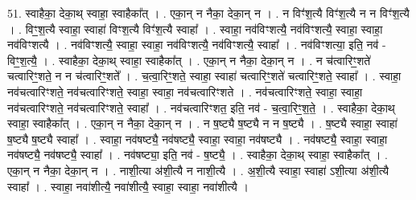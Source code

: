 \documentclass[17pt]{extarticle}
\begin{document}
51. स्वाहैका॒ देका॒थ् स्वाहा॒ स्वाहैका᳚त् । . एका॒न् न नैका॒ देका॒न् न । . न विꣳ॑श॒त्यै विꣳ॑श॒त्यै न न विꣳ॑श॒त्यै । . विꣳ॒॒श॒त्यै स्वाहा॒ स्वाहा॑ विꣳश॒त्यै विꣳ॑श॒त्यै स्वाहा᳚ । . स्वाहा॒ नव॑विꣳशत्यै॒ नव॑विꣳशत्यै॒ स्वाहा॒ स्वाहा॒ नव॑विꣳशत्यै । . नव॑विꣳशत्यै॒ स्वाहा॒ स्वाहा॒ नव॑विꣳशत्यै॒ नव॑विꣳशत्यै॒ स्वाहा᳚ । . नव॑विꣳशत्या॒ इति॒ नव॑ - विꣳ॒॒श॒त्यै॒ । . स्वाहैका॒ देका॒थ् स्वाहा॒ स्वाहैका᳚त् । . एका॒न् न नैका॒ देका॒न् न । . न च॑त्वारिꣳ॒॒शते॑ चत्वारिꣳ॒॒शते॒ न न च॑त्वारिꣳ॒॒शते᳚ । . च॒त्वा॒रिꣳ॒॒शते॒ स्वाहा॒ स्वाहा॑ चत्वारिꣳ॒॒शते॑ चत्वारिꣳ॒॒शते॒ स्वाहा᳚ । . स्वाहा॒ नव॑चत्वारिꣳशते॒ नव॑चत्वारिꣳशते॒ स्वाहा॒ स्वाहा॒ नव॑चत्वारिꣳशते । . नव॑चत्वारिꣳशते॒ स्वाहा॒ स्वाहा॒ नव॑चत्वारिꣳशते॒ नव॑चत्वारिꣳशते॒ स्वाहा᳚ । . नव॑चत्वारिꣳशत॒ इति॒ नव॑ - च॒त्वा॒रिꣳ॒॒श॒ते॒ । . स्वाहैका॒ देका॒थ् स्वाहा॒ स्वाहैका᳚त् । . एका॒न् न नैका॒ देका॒न् न । . न ष॒ष्ट्यै ष॒ष्ट्यै न न ष॒ष्ट्यै । . ष॒ष्ट्यै स्वाहा॒ स्वाहा॑ ष॒ष्ट्यै ष॒ष्ट्यै स्वाहा᳚ । . स्वाहा॒ नव॑षष्ट्यै॒ नव॑षष्ट्यै॒ स्वाहा॒ स्वाहा॒ नव॑षष्ट्यै । . नव॑षष्ट्यै॒ स्वाहा॒ स्वाहा॒ नव॑षष्ट्यै॒ नव॑षष्ट्यै॒ स्वाहा᳚ । . नव॑षष्ट्या॒ इति॒ नव॑ - ष॒ष्ट्यै॒ । . स्वाहैका॒ देका॒थ् स्वाहा॒ स्वाहैका᳚त् । . एका॒न् न नैका॒ देका॒न् न । . नाशी॒त्या अ॑शी॒त्यै न नाशी॒त्यै । . अ॒शी॒त्यै स्वाहा॒ स्वाहा॑ ऽशी॒त्या अ॑शी॒त्यै स्वाहा᳚ । . स्वाहा॒ नवा॑शीत्यै॒ नवा॑शीत्यै॒ स्वाहा॒ स्वाहा॒ नवा॑शीत्यै । \newline
\end{document}
